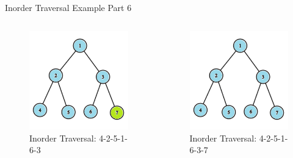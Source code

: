 \documentclass[aspectratio=169]{beamer}%
\begin{document}
\begin{frame}{Inorder Traversal Example Part 6}
    \begin{columns}
        \begin{column}{0.32\textwidth}
            \begin{figure}
                \centering
                \includegraphics[width = .9\linewidth]{tree-in 16.png}
                \caption{Inorder Traversal:  4-2-5-1-6-3}
            \end{figure}
        \end{column}
        \hfill
        \begin{column}{0.32\textwidth}
            \begin{figure}
                \centering
                \includegraphics[width = .9\linewidth]{tree-in 17.png}
                \caption{Inorder Traversal:  4-2-5-1-6-3-7}
            \end{figure}
        \end{column}
    \end{columns}
\end{frame}
\end{document}
